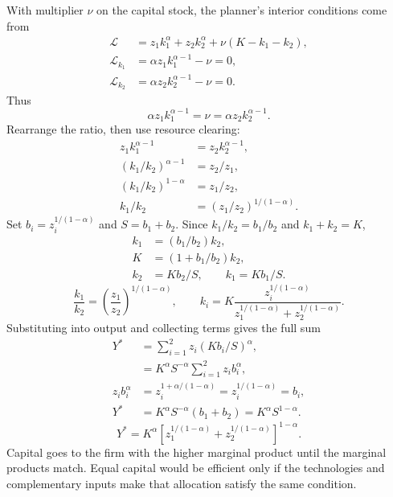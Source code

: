 With multiplier $\nu$ on the capital stock, the planner's interior conditions
come from
\begin{align}
\mathscr L&=z_1k_1^\alpha+z_2k_2^\alpha+\nu(K-k_1-k_2),\\
\mathscr L_{k_1}&=\alpha z_1k_1^{\alpha-1}-\nu=0,\\
\mathscr L_{k_2}&=\alpha z_2k_2^{\alpha-1}-\nu=0.
\end{align}
Thus
\begin{equation}
\alpha z_1k_1^{\alpha-1}=\nu
=\alpha z_2k_2^{\alpha-1}.
\end{equation}
Rearrange the ratio, then use resource clearing:
\begin{align}
z_1k_1^{\alpha-1}&=z_2k_2^{\alpha-1},\\
(k_1/k_2)^{\alpha-1}&=z_2/z_1,\\
(k_1/k_2)^{1-\alpha}&=z_1/z_2,\\
k_1/k_2&=(z_1/z_2)^{1/(1-\alpha)}.
\end{align}
Set $b_i=z_i^{1/(1-\alpha)}$ and $S=b_1+b_2$. Since
$k_1/k_2=b_1/b_2$ and $k_1+k_2=K$,
\begin{align}
k_1&=(b_1/b_2)k_2,\\
K&=(1+b_1/b_2)k_2,\\
k_2&=Kb_2/S,\qquad k_1=Kb_1/S.
\end{align}
\begin{equation}\label{eq:eg-efficient-allocation}
\frac{k_1}{k_2}=\left(\frac{z_1}{z_2}\right)^{1/(1-\alpha)},\qquad
k_i=K\frac{z_i^{1/(1-\alpha)}}{z_1^{1/(1-\alpha)}+z_2^{1/(1-\alpha)}}.
\end{equation}
Substituting into output and collecting terms gives
the full sum
\begin{align}
Y^*&=\sum_{i=1}^2z_i(Kb_i/S)^\alpha,\\
 &=K^\alpha S^{-\alpha}\sum_{i=1}^2z_i b_i^\alpha,\\
z_i b_i^\alpha&=z_i^{1+\alpha/(1-\alpha)}
                  =z_i^{1/(1-\alpha)}=b_i,\\
Y^*&=K^\alpha S^{-\alpha}(b_1+b_2)
     =K^\alpha S^{1-\alpha}.
\end{align}
\begin{equation}\label{eq:eg-aggregate-allocation}
Y^*=K^\alpha
\left[z_1^{1/(1-\alpha)}+z_2^{1/(1-\alpha)}\right]^{1-\alpha}.
\end{equation}
Capital goes to the firm with the higher marginal product until the marginal
products match. Equal capital would be efficient only if the technologies
and complementary inputs make that allocation satisfy the same condition.

